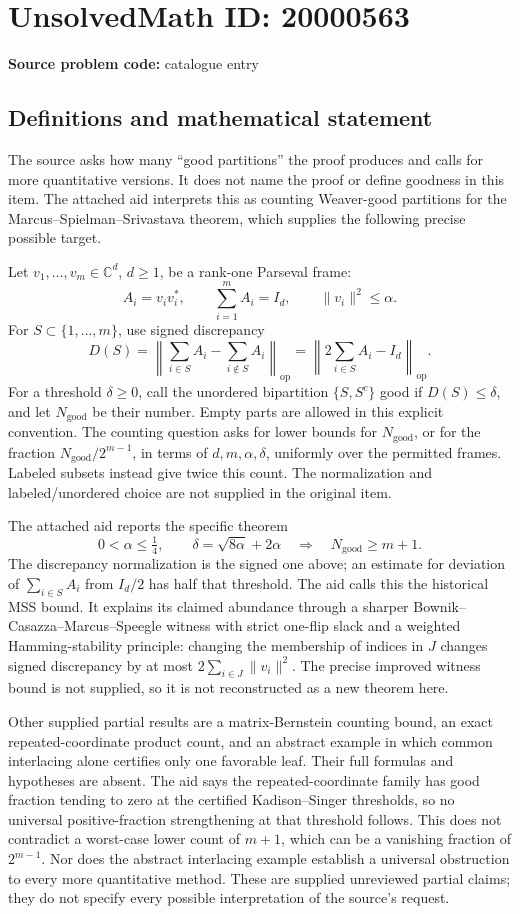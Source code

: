 \documentclass[11pt]{article}
\newcommand{\C}{\mathbb{C}}
\begin{document}
\section*{UnsolvedMath ID: 20000563}
\textbf{Source problem code:} catalogue entry
\subsection{Definitions and mathematical statement}
The source asks how many ``good partitions'' the proof produces and calls for more quantitative versions. It does not name the proof or define goodness in this item. The attached aid interprets this as counting Weaver-good partitions for the Marcus--Spielman--Srivastava theorem, which supplies the following precise possible target.

Let \(v_1,\ldots,v_m\in\C^d\), \(d\geq1\), be a rank-one Parseval frame:
\[
A_i=v_iv_i^*,\qquad \sum_{i=1}^m A_i=I_d,\qquad
\|v_i\|^2\leq\alpha.
\]
For \(S\subset\{1,\ldots,m\}\), use signed discrepancy
\[
D(S)=\left\|\sum_{i\in S}A_i-\sum_{i\notin S}A_i\right\|_{\mathrm{op}}
=\left\|2\sum_{i\in S}A_i-I_d\right\|_{\mathrm{op}}.
\]
For a threshold \(\delta\geq0\), call the unordered bipartition \(\{S,S^c\}\) good if \(D(S)\leq\delta\), and let \(N_{\mathrm{good}}\) be their number. Empty parts are allowed in this explicit convention. The counting question asks for lower bounds for \(N_{\mathrm{good}}\), or for the fraction \(N_{\mathrm{good}}/2^{m-1}\), in terms of \(d,m,\alpha,\delta\), uniformly over the permitted frames. Labeled subsets instead give twice this count. The normalization and labeled/unordered choice are not supplied in the original item.

The attached aid reports the specific theorem
\[
0<\alpha\leq\tfrac14,\qquad
\delta=\sqrt{8\alpha}+2\alpha
\quad\Longrightarrow\quad N_{\mathrm{good}}\geq m+1.
\]
The discrepancy normalization is the signed one above; an estimate for deviation of \(\sum_{i\in S}A_i\) from \(I_d/2\) has half that threshold. The aid calls this the historical MSS bound. It explains its claimed abundance through a sharper Bownik--Casazza--Marcus--Speegle witness with strict one-flip slack and a weighted Hamming-stability principle: changing the membership of indices in \(J\) changes signed discrepancy by at most \(2\sum_{i\in J}\|v_i\|^2\). The precise improved witness bound is not supplied, so it is not reconstructed as a new theorem here.

Other supplied partial results are a matrix-Bernstein counting bound, an exact repeated-coordinate product count, and an abstract example in which common interlacing alone certifies only one favorable leaf. Their full formulas and hypotheses are absent. The aid says the repeated-coordinate family has good fraction tending to zero at the certified Kadison--Singer thresholds, so no universal positive-fraction strengthening at that threshold follows. This does not contradict a worst-case lower count of \(m+1\), which can be a vanishing fraction of \(2^{m-1}\). Nor does the abstract interlacing example establish a universal obstruction to every more quantitative method. These are supplied unreviewed partial claims; they do not specify every possible interpretation of the source's request.
\end{document}
